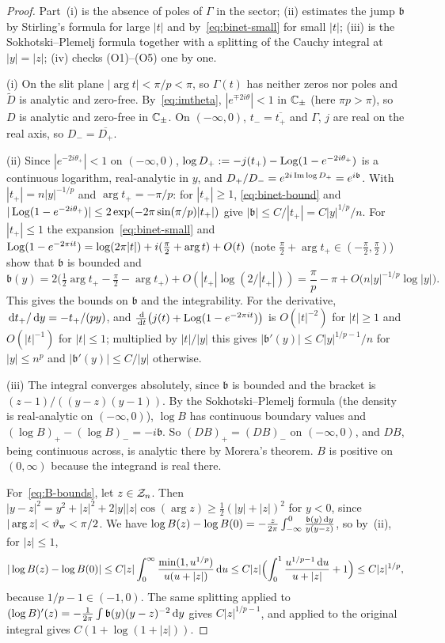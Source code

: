 \begin{proof}
Part~(i) is the absence of poles of $\Gamma$ in the sector; (ii) estimates the jump $\mathfrak b$ by Stirling's formula
for large $|t|$ and by~\eqref{eq:binet-small} for small $|t|$; (iii) is the Sokhotski--Plemelj formula together with a
splitting of the Cauchy integral at $|y|=|z|$; (iv) checks (O1)--(O5) one by one.

(i) On the slit plane $|\arg t|<\pi/p<\pi$, so $\Gamma(t)$ has neither zeros nor poles and $\tilde D$ is analytic and
zero-free. By~\eqref{eq:imtheta}, $|e^{\mp2i\theta}|<1$ in $\mathbb{C}_\pm$ (here $\pi p>\pi$), so $D$ is analytic and
zero-free in $\mathbb{C}_\pm$. On $(-\infty,0)$, $t_-=\overline{t_+}$ and $\Gamma$, $j$ are real on the real axis, so
$D_-=\overline{D_+}$.

(ii) Since $|e^{-2i\theta_+}|<1$ on $(-\infty,0)$, $\log D_+:=-j(t_+)-\operatorname{Log}(1-e^{-2i\theta_+})$ is a continuous
logarithm, real-analytic in $y$, and $D_+/D_-=e^{2i\operatorname{Im}\log D_+}=e^{i\mathfrak b}$. With $|t_+|=n|y|^{-1/p}$ and
$\arg t_+=-\pi/p$: for $|t_+|\ge1$, \eqref{eq:binet-bound} and
$|\operatorname{Log}(1-e^{-2i\theta_+})|\le2\exp(-2\pi\sin(\pi/p)|t_+|)$ give $|\mathfrak b|\le C/|t_+|=C|y|^{1/p}/n$. For $|t_+|\le1$
the expansion~\eqref{eq:binet-small} and $\operatorname{Log}(1-e^{-2\pi it})=\log(2\pi|t|)+i(\frac\pi2+\arg t)+O(t)$ (note
$\frac\pi2+\arg t_+\in(-\frac\pi2,\frac\pi2)$) show that $\mathfrak b$ is bounded and
\[
  \mathfrak b(y)=2\bigl(\tfrac12\arg t_+-\tfrac\pi2-\arg t_+\bigr)+O(|t_+|\log(2/|t_+|))=\frac\pi p-\pi+O\bigl(n|y|^{-1/p}\log|y|\bigr).
\]
This gives the bounds on $\mathfrak b$ and the integrability. For the derivative, $\,\mathrm{d} t_+/\,\mathrm{d} y=-t_+/(py)$, and
$\frac{\,\mathrm{d}}{\,\mathrm{d} t}\bigl(j(t)+\operatorname{Log}(1-e^{-2\pi it})\bigr)$ is $O(|t|^{-2})$ for $|t|\ge1$ and $O(|t|^{-1})$ for
$|t|\le1$; multiplied by $|t|/|y|$ this gives $|\mathfrak b'(y)|\le C|y|^{1/p-1}/n$ for $|y|\le n^p$ and
$|\mathfrak b'(y)|\le C/|y|$ otherwise.

(iii) The integral converges absolutely, since $\mathfrak b$ is bounded and the bracket is $(z-1)/((y-z)(y-1))$. By the
Sokhotski--Plemelj formula (the density is real-analytic on $(-\infty,0)$), $\log B$ has continuous boundary values
and $(\log B)_+-(\log B)_-=-i\mathfrak b$. So $(DB)_+=(DB)_-$ on $(-\infty,0)$, and $DB$, being continuous across, is
analytic there by Morera's theorem. $B$ is positive on $(0,\infty)$ because the integrand is real there.

For~\eqref{eq:B-bounds}, let $z\in\mathcal{Z}_n$. Then $|y-z|^2=y^2+|z|^2+2|y||z|\cos(\arg z)\ge\frac12(|y|+|z|)^2$ for $y<0$,
since $|\arg z|<\vartheta_{\mathrm{w}}<\pi/2$. We have $\log B(z)-\log B(0)=-\frac z{2\pi}\int_{-\infty}^0\frac{\mathfrak b(y)\,\mathrm{d} y}{y(y-z)}$, so
by~(ii), for $|z|\le1$,
\[
  |\log B(z)-\log B(0)|\le C|z|\int_0^\infty\frac{\min(1,u^{1/p})}{u(u+|z|)}\,\mathrm{d} u\le
  C|z|\Bigl(\int_0^1\frac{u^{1/p-1}\,\mathrm{d} u}{u+|z|}+1\Bigr)\le C|z|^{1/p},
\]
because $1/p-1\in(-1,0)$. The same splitting applied to $(\log B)'(z)=-\frac1{2\pi}\int\mathfrak b(y)(y-z)^{-2}\,\mathrm{d} y$
gives $C|z|^{1/p-1}$, and applied to the original integral gives $C(1+\log(1+|z|))$.


\end{proof}

